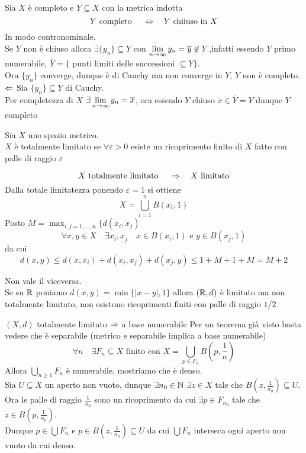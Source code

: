 \spazio
\begin{lem}Sia $X$ \`e completo  e $Y \subseteq X $ con la metrica indotta
$$ Y \text{ completo } \quad \Leftrightarrow \quad Y \text{ chiiuso in } X $$
\proof In modo contronominale.\\
Se $Y$ non \`e chiuso allora $\exists \{ y_n\} \subseteq Y $ con $\displaystyle \lim_{n\to \infty} y_n =\overline{y}\not \in Y $,infatti essendo $Y$  primo numerabile, 
 $\overline{Y}= \{ \text{ punti limiti delle successioni } \subseteq Y  \} $.\\
Ora $\{ y_n\}$ converge, dunque \`e di Cauchy ma non converge in $Y$, $Y$ non \`e completo.\\
$\Leftarrow$ Sia $\{ y_n\}\subseteq Y$ di Cauchy.\\
Per completezza di $X$ $\displaystyle\exists \lim_{n\to \infty} y_n =\overline{x}$, ora essendo $Y$ chiuso $\overline{x}\in \overline{Y}=Y $ dunque $Y$ completo 
\endproof
\end{lem}
\spazio
\begin{defn} Sia $X$ uno spazio metrico.\\
$X$ \`e totalmente limitato se $\forall\varepsilon>0$ esiste un ricoprimento finito di $X$ fatto con palle di raggio $\varepsilon$
\end{defn}
\begin{lem}$$ X \text{ totalmente limitato } \quad \Rightarrow \quad X \text{ limitato}$$
\proof Dalla totale  limitatezza  ponendo $\varepsilon=1$ si ottiene 
$$ X = \bigcup_{i=1}^n  B(x_i, 1)$$
Posto $M=\max_{i,j=1,\dots, n } \{ d(x_i,x_j)$ 
$$ \forall x, y \in X \quad \exists x_i, x_j \quad x \in B(x_i,1) \text{ e } y \in B(x_j,1)$$
da cui
$$ d(x,y)\leq d(x,x_i)+ d(x_i,x_j)+ d(x_j,y)\leq 1 + M +1 +M = M +2 $$
\endproof
\begin{oss}Non vale il viceversa.\\
Se su $\mathbb{R}$ poniamo $d(x,y)=\min \{ \vert x-y \vert, 1\}$ allora $(\mathbb{R},d)$ \`e limitato ma non totalmente limitato, non esistono ricoprimenti finiti con palle di raggio $1/2$
\end{oss}
\end{lem}
\begin{prop} $(X,d)$ totalmente limitato $\Rightarrow$ a base numerabile
\proof Per un teorema gi\`a visto basta vedere che \`e separabile (metrico e separabile implica a base numerabile)
$$ \forall n \quad \exists F_n \subseteq X \text{ finito con } X = \bigcup_{p \in F_n} B\left( p, \frac{1}{n} \right)$$
Allora $\bigcup_{n \geq 1} F_n $ \`e numerabile, mostriamo che \`e denso.\\
Sia $U\subseteq X$ un aperto non vuoto, dunque $\exists n_0 \in \mathbb{N} $ $\exists z \in X$ tale che $B \left( z , \frac{1}{n_0}\right) \subseteq U $.\\
Ora le palle di raggio $\frac{1}{n_0}$ sono un ricoprimento da cui  $\exists p \in F_{n_0}$ tale che  $z \in B\left( p, \frac{1}{n_0} \right)$.\\
Dunque $p \in \bigcup F_n $ e $ p  \in B \left( z, \frac{1}{n_0}\right) \subseteq U $ da cui $\bigcup F_n$ interseca ogni aperto non vuoto da cui denso.
\endproof
\end{prop}

